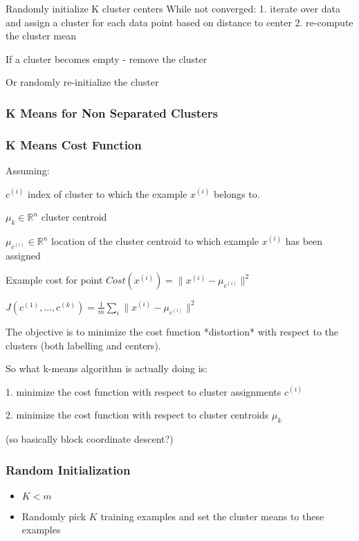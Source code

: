 Randomly initialize K cluster centers
While not converged:
1. iterate over data and assign a cluster for each data point based on distance to center
2. re-compute the cluster mean

If a cluster becomes empty - remove the cluster

Or randomly re-initialize the cluster

\subsubsection{K Means for Non Separated Clusters}

\subsubsection{K Means Cost Function}

Assuming: 

$c^{(i)}$ index of cluster to which the example $x^{(i)}$ belongs to.

$\mu_k \in \mathbb R ^n $ cluster centroid 

$\mu_{c^{(i)}} \in \mathbb R ^n $ location of the cluster centroid to which example $x^{(i)}$ has been assigned

Example cost for point $Cost(x^{(i)}) = \|x^{(i)} - \mu_{c^{(i)}} \|^2$ 

$J(c^{(1)},\dots, c^{(k)})= \frac{1}{m}\sum_i \|x^{(i)} - \mu_{c^{(i)}} \|^2 $

The objective is to minimize the cost function *distortion* with respect to the clusters (both labelling and centers).

So what k-means algorithm is actually doing is:

1. minimize the cost function with respect to cluster assignments $c^{(i)}$

2. minimize the cost function with respect to cluster centroids $\mu_k$ 

(so basically block coordinate descent?)

\subsubsection{Random Initialization}

\begin{itemize}
\item $K < m$
\item Randomly pick $K$ training examples and set the cluster means to these examples
\end{itemize}


